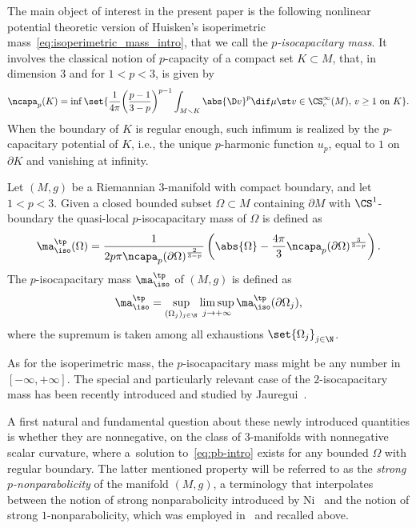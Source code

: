 The main object of interest in the present paper is the following nonlinear potential theoretic version of Huisken's isoperimetric mass~\eqref{eq:isoperimetric_mass_intro}, that we call the {\em $p$-isocapacitary mass}. It involves the classical notion of $p$-capacity of a compact set $K \subset M$, that, in dimension $3$ and for $1 < p <3$, is given by
\begin{equation*}%
 \ncapa_p(K) = \inf \set{\frac{1}{4\pi}\bigg(\frac{p-1}{3-p}\bigg)^{p-1}\int_{M\smallsetminus K} \abs{\D v}^p \dif \mu\st v \in \CS_c^\infty(M),\, v \geq 1\text{ on } K}.
\end{equation*}
When the boundary of $K$ is regular enough, such infimum is realized by the $p$-capacitary potential of $K$, i.e., the unique $p$-harmonic function $u_p$, equal to $1$ on $\partial K$ and vanishing at infinity.
\begin{Definition}%
Let $(M,g)$ be a Riemannian $3$-manifold with compact boundary, and let $1<p<3$. Given a closed bounded subset $\Omega\subset M$ containing $\partial M$ with $\CS^{1}$-boundary the quasi-local $p$-isocapacitary mass of $\Omega$ is defined as
\begin{equation*}%
 \ma_{\iso}^{\tp}(\Omega)=\frac{1}{2p \pi \ncapa_p(\partial \Omega)^{\frac{2}{3-p}}}\left( \abs{\Omega} -\frac{4 \pi}{3} \ncapa_p (\partial \Omega)^\frac{3}{3-p}\right).
\end{equation*}
The $p$-isocapacitary mass $\ma^{\tp}_{\iso}$ of $(M,g)$ is defined as \begin{equation}\label{eq:isopcapacitary_mass}
 \ma_{\iso}^{\tp} = \sup_{(\Omega_j)_{j \in \N}} \limsup_{j \to +\infty} \ma_{\iso}^{\tp}(\partial \Omega_j),
\end{equation}
where the supremum is taken among all exhaustions $\set{\Omega_j}_{j\in \N}$.
\end{Definition}
As for the isoperimetric mass, the $p$-isocapacitary mass might be any number in $[-\infty,+\infty]$. The special and particularly relevant case of the $2$-isocapacitary mass has been recently introduced and studied by Jauregui~\cite{jauregui_admmasscapacityvolumedeficit_2020}.

A first natural and fundamental question about these newly introduced quantities is whether they are nonnegative, on the class of $3$-manifolds with nonnegative scalar curvature, where a~solution to~\eqref{eq:pb-intro} exists for any bounded $\Omega$ with regular boundary. The latter mentioned property will be referred to as the \textit{strong $p$-nonparabolicity} of the manifold $(M,g)$, a terminology that interpolates between the notion of strong nonparabolicity introduced by Ni~\cite{ni_meanvaluetheoremsmanifolds_2007} and the notion of strong $1$-nonparabolicity, which was employed in~\cite{benatti_isoperimetricriemannianpenroseinequality_2022} and recalled above.

